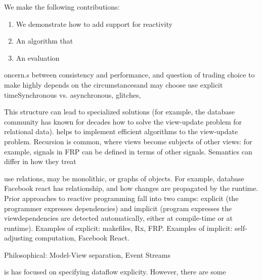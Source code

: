  We make the following contributions:
 
 
 \begin{enumerate}
 \item We demonstrate how to add support for reactivity 
 \item  An algorithm that
 \item An evaluation
 \end{enumerate}
 
 
     
   
 
\hidden
{
oncern.s between consistency and performance, and question of trading  choice to make highly depends on the circumstancesand may choose use explicit timeSynchronous vs. asynchronous, glitches, 
 
This structure can lead to specialized solutions (for example, the database community has known for decades how to solve the view-update problem for relational data). helps to implement efficient algorithms  to the view-update problem. Recursion is common, where views become subjects of other views: for example, signals in FRP can be defined in terms of other signals. Semantics can differ in how they treat 


use relations, may be monolithic, or graphs of objects. For example, database Facebook react has 
relationship, and how changes are propagated by the runtime. Prior approaches to reactive programming fall into two camps: explicit (the programmer expresses dependencies) and implicit (program expresses the viewdependencies are detected automatically, either at compile-time or at runtime).
Examples of explicit: makefiles, Rx, FRP. Examples of implicit: self-adjusting computation, Facebook React.

Philosophical: Model-View separation, Event Streams

  is has focused on specifying dataflow explicity. However, there are some 
}

